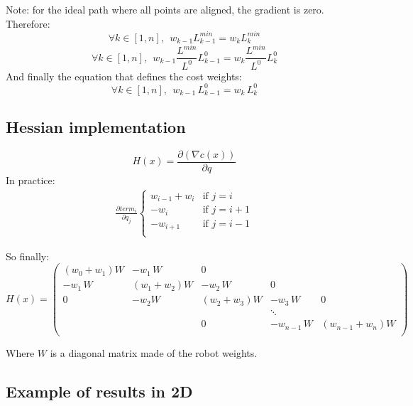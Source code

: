 \documentclass {article}
\begin{document}
Note: for the ideal path where all points are aligned, the gradient is zero. 
Therefore:
$$
\forall k \in [1,n], \ \ w_{k-1}L_{k-1}^{min}  = w_{k}L_k^{min}
$$
$$
\forall k \in [1,n], \ \ w_{k-1}\frac{L^{min}}{L^{0}}L_{k-1}^{0}  = 
w_{k}\frac{L^{min}}{L^{0}}L_k^{0}
$$
And finally the equation that defines the cost weights:
$$
\forall k \in [1,n], \ \ w_{k-1}\,L_{k-1}^{0}  = w_{k}\,L_k^{0}
$$


\subsection{Hessian implementation}
$$
H(x) = \frac{\partial (\nabla c(x))}{\partial q}
$$
In practice:
\begin{align}
  \frac{\partial term_i}{\partial q_j}
  \begin{cases}
    w_{i-1}+w_i & \text{if }j=i\\
    -w_i  & \text{if }j=i+1\\
    -w_{i+1} & \text{if }j=i-1\\
  \end{cases}
\end{align}


So finally:
$$
H(x) =
\left(\begin{array}{ccccc}
(w_0+w_1)W & -w_1\,W & 0 & & \\
-w_1\,W & (w_1+w_2)W & -w_2\,W & 0 & \\
0 & -w_2W & (w_2+w_3)W & -w_3\,W & 0 \\
 &  &  & \ddots &  \\
 &  & 0 & -w_{n-1}\,W & (w_{n-1}+w_n)W \\
\end{array}
\right)
$$

Where $W$ is a diagonal matrix made of the robot weights.


\subsection{Example of results in 2D}
\end{document}
